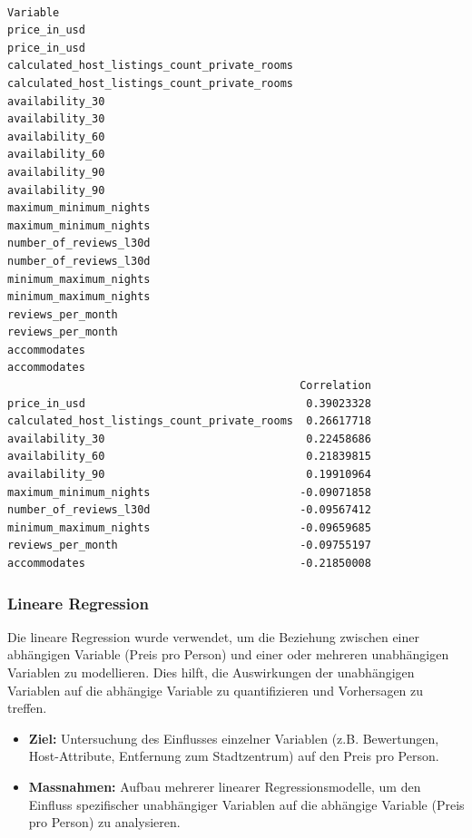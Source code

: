 \documentclass[
  journal,
]{IEEEtran}%
\begin{document}
\begin{verbatim}
                                                                                 Variable
price_in_usd                                                                 price_in_usd
calculated_host_listings_count_private_rooms calculated_host_listings_count_private_rooms
availability_30                                                           availability_30
availability_60                                                           availability_60
availability_90                                                           availability_90
maximum_minimum_nights                                             maximum_minimum_nights
number_of_reviews_l30d                                             number_of_reviews_l30d
minimum_maximum_nights                                             minimum_maximum_nights
reviews_per_month                                                       reviews_per_month
accommodates                                                                 accommodates
                                             Correlation
price_in_usd                                  0.39023328
calculated_host_listings_count_private_rooms  0.26617718
availability_30                               0.22458686
availability_60                               0.21839815
availability_90                               0.19910964
maximum_minimum_nights                       -0.09071858
number_of_reviews_l30d                       -0.09567412
minimum_maximum_nights                       -0.09659685
reviews_per_month                            -0.09755197
accommodates                                 -0.21850008
\end{verbatim}

\subsubsection{\texorpdfstring{\textbf{Lineare
Regression}}{Lineare Regression}}\label{lineare-regression}

Die lineare Regression wurde verwendet, um die Beziehung zwischen einer
abhängigen Variable (Preis pro Person) und einer oder mehreren
unabhängigen Variablen zu modellieren. Dies hilft, die Auswirkungen der
unabhängigen Variablen auf die abhängige Variable zu quantifizieren und
Vorhersagen zu treffen.

\begin{itemize}
\item
  \textbf{Ziel:} Untersuchung des Einflusses einzelner Variablen (z.B.
  Bewertungen, Host-Attribute, Entfernung zum Stadtzentrum) auf den
  Preis pro Person.
\item
  \textbf{Massnahmen:} Aufbau mehrerer linearer Regressionsmodelle, um
  den Einfluss spezifischer unabhängiger Variablen auf die abhängige
  Variable (Preis pro Person) zu analysieren.
\end{itemize}
\end{document}
